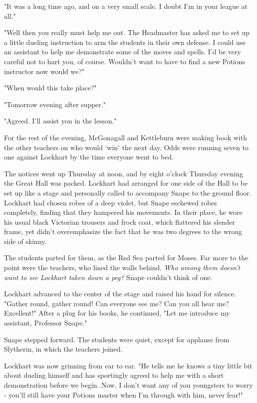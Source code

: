 "It was a long time ago, and on a very small scale. I doubt I'm in your league at all."

"Well then you really must help me out. The Headmaster has asked me to set up a little dueling instruction to arm the students in their own defense. I could use an assistant to help me demonstrate some of the moves and spells. I'd be very careful not to hurt you, of course. Wouldn't want to have to find a new Potions instructor now would we?"

"When would this take place?"

"Tomorrow evening after supper."

"Agreed. I'll assist you in the lesson."

For the rest of the evening, McGonagall and Kettleburn were making book with the other teachers on who would `win' the next day. Odds were running seven to one against Lockhart by the time everyone went to bed.

The notices went up Thursday at noon, and by eight o'clock Thursday evening the Great Hall was packed. Lockhart had arranged for one side of the Hall to be set up like a stage and personally called to accompany Snape to the ground floor. Lockhart had chosen robes of a deep violet, but Snape eschewed robes completely, finding that they hampered his movements. In their place, he wore his usual black Victorian trousers and frock coat, which flattered his slender frame, yet didn't overemphasize the fact that he was two degrees to the wrong side of skinny.

The students parted for them, as the Red Sea parted for Moses. Far more to the point were the teachers, who lined the walls behind. \emph{Who among them doesn't want to see Lockhart taken down a peg?} Snape couldn't think of one.

Lockhart advanced to the center of the stage and raised his hand for silence. "Gather round, gather round! Can everyone see me? Can you all hear me? Excellent!" After a plug for his books, he continued, "Let me introduce my assistant, Professor Snape."

Snape stepped forward. The students were quiet, except for applause from Slytherin, in which the teachers joined.

Lockhart was now grinning from ear to ear. "He tells me he knows a tiny little bit about dueling himself and has sportingly agreed to help me with a short demonstration before we begin. Now, I don't want any of you youngsters to worry - you'll still have your Potions master when I'm through with him, never fear!"


